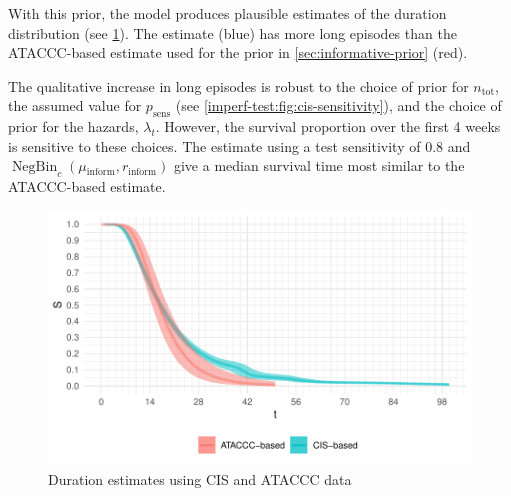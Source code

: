 \documentclass[12pt]{article}
\DeclareMathOperator{\NBr}{NegBin}
\newcommand{\NBc}{\NBr_{c}}
\newcommand{\psens}{p_\text{sens}}
\newcommand{\ntot}{n_\text{tot}}
\newcommand{\inform}{{_{\text{inform}}}}
\begin{document}
With this prior, the model produces plausible estimates of the duration distribution (see \cref{imperf-test:fig:cis-estimates}).
The estimate (blue) has more long episodes than the ATACCC-based estimate used for the prior in \cref{sec:informative-prior} (red).

The qualitative increase in long episodes is robust to the choice of prior for $\ntot$, the assumed value for $\psens$ (see \cref{imperf-test:fig:cis-sensitivity}), and the choice of prior for the hazards, $\lambda_t$.
However, the survival proportion over the first 4 weeks is sensitive to these choices.
The estimate using a test sensitivity of 0.8 and $\NBc(\mu\inform, r\inform)$ give a median survival time most similar to the ATACCC-based estimate.
\begin{figure}
  \centering \includegraphics{figures/output/CIS_final}
  \caption{Duration estimates using CIS and ATACCC data}
  \label{imperf-test:fig:cis-estimates}
\end{figure}
\end{document}

